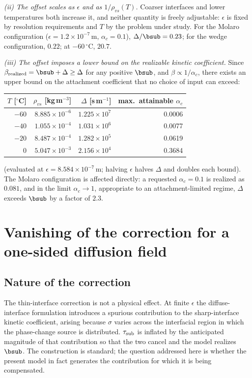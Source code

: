 \emph{(ii) The offset scales as $\epsilon$ and as $1/\rho_{vs}(T)$.} Coarser interfaces and
lower temperatures both increase it, and neither quantity is freely adjustable: $\epsilon$
is fixed by resolution requirements and $T$ by the problem under study. For the Molaro
configuration ($\epsilon=1.2\times10^{-7}$\,m, $\alpha_c=0.1$), $\Delta/\bsub=0.23$; for
the wedge configuration, $0.22$; at $-60\,^\circ$C, $20.7$.

\emph{(iii) The offset imposes a lower bound on the realizable kinetic coefficient.} Since
$\beta_{\rm realized}=\bsub+\Delta\ge\Delta$ for any positive $\bsub$, and
$\beta\propto1/\alpha_c$, there exists an upper bound on the attachment coefficient that no
choice of input can exceed:
\begin{center}\small\begin{tabular}{rrrr}\toprule
$T$ [$^\circ$C] & $\rho_{vs}$ [kg\,m$^{-3}$] & $\Delta$ [s\,m$^{-1}$] & max.\ attainable $\alpha_c$\\ \midrule
$-60$ & $8.885\times10^{-6}$ & $1.225\times10^{7}$ & 0.0006\\
$-40$ & $1.055\times10^{-4}$ & $1.031\times10^{6}$ & 0.0077\\
$-20$ & $8.487\times10^{-4}$ & $1.282\times10^{5}$ & 0.0619\\
$  0$ & $5.047\times10^{-3}$ & $2.156\times10^{4}$ & 0.3684\\ \bottomrule
\end{tabular}\end{center}
(evaluated at $\epsilon=8.584\times10^{-7}$\,m; halving $\epsilon$ halves $\Delta$ and
doubles each bound). The Molaro configuration is affected directly: a requested
$\alpha_c=0.1$ is realized as $0.081$, and in the limit $\alpha_c\to1$, appropriate to an
attachment-limited regime, $\Delta$ exceeds $\bsub$ by a factor of $2.3$.

\section{Vanishing of the correction for a one-sided diffusion field}\label{sec:inner}

\subsection{Nature of the correction}
The thin-interface correction is not a physical effect. At finite $\epsilon$ the
diffuse-interface formulation introduces a spurious contribution to the sharp-interface
kinetic coefficient, arising because $\sigma$ varies across the interfacial region in
which the phase-change source is distributed. $\tau_{\rm sub}$ is inflated by the
anticipated magnitude of that contribution so that the two cancel and the model realizes
$\bsub$. The construction is standard; the question addressed here is whether the present
model in fact generates the contribution for which it is being compensated.

